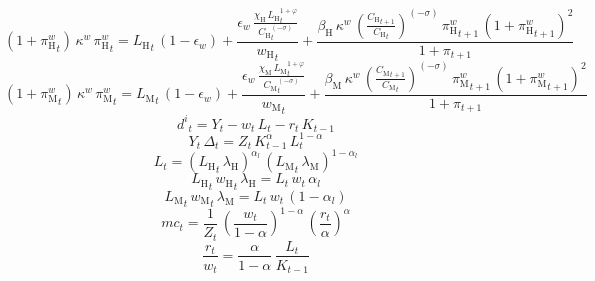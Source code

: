 \begin{dmath}
\left(1+{\pi^w_\mathrm{H}}_{t}\right)\, {\kappa^w}\, {\pi^w_\mathrm{H}}_{t}={L_\mathrm{H}}_{t}\, \left(1-{\epsilon_w}\right)+\frac{{\epsilon_w}\, \frac{{\chi_\mathrm{H}}\, {L_\mathrm{H}}_{t}^{1+{\varphi}}}{{C_\mathrm{H}}_{t}^{\left(-{\sigma}\right)}}}{{w_\mathrm{H}}_{t}}+\frac{{\beta_\mathrm{H}}\, {\kappa^w}\, \left(\frac{{C_\mathrm{H}}_{t+1}}{{C_\mathrm{H}}_{t}}\right)^{\left(-{\sigma}\right)}\, {\pi^w_\mathrm{H}}_{t+1}\, \left(1+{\pi^w_\mathrm{H}}_{t+1}\right)^{2}}{1+{\pi}_{t+1}}
\end{dmath}
\begin{dmath}
\left(1+{\pi^w_\mathrm{M}}_{t}\right)\, {\kappa^w}\, {\pi^w_\mathrm{M}}_{t}={L_\mathrm{M}}_{t}\, \left(1-{\epsilon_w}\right)+\frac{{\epsilon_w}\, \frac{{\chi_\mathrm{M}}\, {L_\mathrm{M}}_{t}^{1+{\varphi}}}{{C_\mathrm{M}}_{t}^{\left(-{\sigma}\right)}}}{{w_\mathrm{M}}_{t}}+\frac{{\beta_\mathrm{M}}\, {\kappa^w}\, \left(\frac{{C_\mathrm{M}}_{t+1}}{{C_\mathrm{M}}_{t}}\right)^{\left(-{\sigma}\right)}\, {\pi^w_\mathrm{M}}_{t+1}\, \left(1+{\pi^w_\mathrm{M}}_{t+1}\right)^{2}}{1+{\pi}_{t+1}}
\end{dmath}
\begin{dmath}
{d^i}_{t}={Y}_{t}-{w}_{t}\, {L}_{t}-{r}_{t}\, {K}_{t-1}
\end{dmath}
\begin{dmath}
{Y}_{t}\, {\Delta}_{t}={Z}_{t}\, {K}_{t-1}^{{\alpha}}\, {L}_{t}^{1-{\alpha}}
\end{dmath}
\begin{dmath}
{L}_{t}=\left({L_\mathrm{H}}_{t}\, {\lambda_\mathrm{H}}\right)^{{\alpha_l}}\, \left({L_\mathrm{M}}_{t}\, {\lambda_\mathrm{M}}\right)^{1-{\alpha_l}}
\end{dmath}
\begin{dmath}
{L_\mathrm{H}}_{t}\, {w_\mathrm{H}}_{t}\, {\lambda_\mathrm{H}}={L}_{t}\, {w}_{t}\, {\alpha_l}
\end{dmath}
\begin{dmath}
{L_\mathrm{M}}_{t}\, {w_\mathrm{M}}_{t}\, {\lambda_\mathrm{M}}={L}_{t}\, {w}_{t}\, \left(1-{\alpha_l}\right)
\end{dmath}
\begin{dmath}
{mc}_{t}=\frac{1}{{Z}_{t}}\, \left(\frac{{w}_{t}}{1-{\alpha}}\right)^{1-{\alpha}}\, \left(\frac{{r}_{t}}{{\alpha}}\right)^{{\alpha}}
\end{dmath}
\begin{dmath}
\frac{{r}_{t}}{{w}_{t}}=\frac{{\alpha}}{1-{\alpha}}\, \frac{{L}_{t}}{{K}_{t-1}}
\end{dmath}
